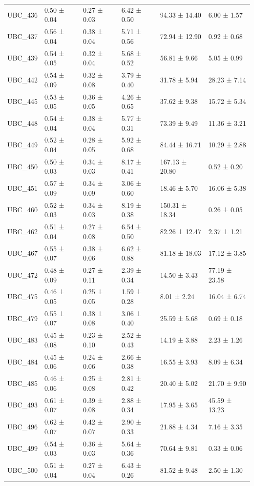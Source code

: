 \begin{tabular}{llllll}
UBC_436 & 0.50 ± 0.04 & 0.27 ± 0.03 & 6.42 ± 0.50 & 94.33 ± 14.40 & 6.00 ± 1.57 \\
UBC_437 & 0.56 ± 0.04 & 0.38 ± 0.04 & 5.71 ± 0.56 & 72.94 ± 12.90 & 0.92 ± 0.68 \\
UBC_439 & 0.54 ± 0.05 & 0.32 ± 0.04 & 5.68 ± 0.52 & 56.81 ± 9.66 & 5.05 ± 0.99 \\
UBC_442 & 0.54 ± 0.09 & 0.32 ± 0.08 & 3.79 ± 0.40 & 31.78 ± 5.94 & 28.23 ± 7.14 \\
UBC_445 & 0.53 ± 0.05 & 0.36 ± 0.05 & 4.26 ± 0.65 & 37.62 ± 9.38 & 15.72 ± 5.34 \\
UBC_448 & 0.54 ± 0.04 & 0.38 ± 0.04 & 5.77 ± 0.31 & 73.39 ± 9.49 & 11.36 ± 3.21 \\
UBC_449 & 0.52 ± 0.04 & 0.28 ± 0.05 & 5.92 ± 0.68 & 84.44 ± 16.71 & 10.29 ± 2.88 \\
UBC_450 & 0.50 ± 0.03 & 0.34 ± 0.03 & 8.17 ± 0.41 & 167.13 ± 20.80 & 0.52 ± 0.20 \\
UBC_451 & 0.57 ± 0.09 & 0.34 ± 0.09 & 3.06 ± 0.60 & 18.46 ± 5.70 & 16.06 ± 5.38 \\
UBC_460 & 0.52 ± 0.03 & 0.34 ± 0.03 & 8.19 ± 0.38 & 150.31 ± 18.34 & 0.26 ± 0.05 \\
UBC_462 & 0.51 ± 0.04 & 0.27 ± 0.08 & 6.54 ± 0.50 & 82.26 ± 12.47 & 2.37 ± 1.21 \\
UBC_467 & 0.55 ± 0.07 & 0.38 ± 0.06 & 6.62 ± 0.88 & 81.18 ± 18.03 & 17.12 ± 3.85 \\
UBC_472 & 0.48 ± 0.09 & 0.27 ± 0.11 & 2.39 ± 0.34 & 14.50 ± 3.43 & 77.19 ± 23.58 \\
UBC_475 & 0.46 ± 0.05 & 0.25 ± 0.05 & 1.59 ± 0.28 & 8.01 ± 2.24 & 16.04 ± 6.74 \\
UBC_479 & 0.55 ± 0.07 & 0.38 ± 0.08 & 3.06 ± 0.40 & 25.59 ± 5.68 & 0.69 ± 0.18 \\
UBC_483 & 0.45 ± 0.08 & 0.23 ± 0.10 & 2.52 ± 0.43 & 14.19 ± 3.88 & 2.23 ± 1.26 \\
UBC_484 & 0.45 ± 0.06 & 0.24 ± 0.06 & 2.66 ± 0.38 & 16.55 ± 3.93 & 8.09 ± 6.34 \\
UBC_485 & 0.46 ± 0.06 & 0.25 ± 0.08 & 2.81 ± 0.42 & 20.40 ± 5.02 & 21.70 ± 9.90 \\
UBC_493 & 0.61 ± 0.07 & 0.39 ± 0.08 & 2.88 ± 0.34 & 17.95 ± 3.65 & 45.59 ± 13.23 \\
UBC_496 & 0.62 ± 0.07 & 0.42 ± 0.07 & 2.90 ± 0.33 & 21.88 ± 4.34 & 7.16 ± 3.35 \\
UBC_499 & 0.54 ± 0.03 & 0.36 ± 0.03 & 5.64 ± 0.36 & 70.64 ± 9.81 & 0.33 ± 0.06 \\
UBC_500 & 0.51 ± 0.04 & 0.27 ± 0.04 & 6.43 ± 0.26 & 81.52 ± 9.48 & 2.50 ± 1.30 \\

\end{tabular}
